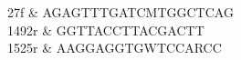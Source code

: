 	{27f} & {AGAGTTTGATCMTGGCTCAG} \\
	{1492r} & {GGTTACCTTACGACTT} \\
	{1525r} & {AAGGAGGTGWTCCARCC} \\
